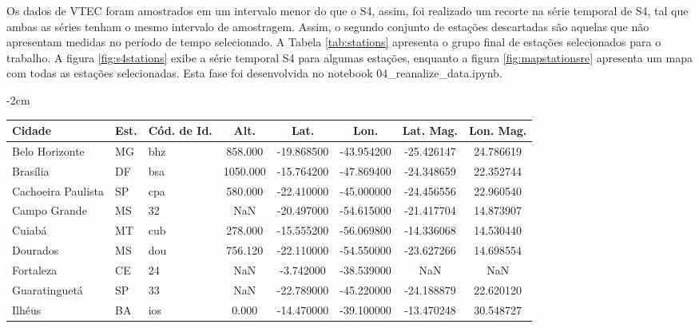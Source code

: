 Os dados de VTEC foram amostrados em um intervalo menor do que o S4, assim, foi realizado um recorte na série temporal de S4, tal que ambas as séries tenham o mesmo intervalo de amostragem. Assim, o segundo conjunto de estações descartadas são aquelas que não apresentam medidas no período de tempo selecionado. A Tabela \ref{tab:stations} apresenta o grupo final de estações selecionados para o trabalho. A figura \ref{fig:s4stations} exibe a série temporal S4 para algumas estações, enquanto a figura \ref{fig:mapstationsre} apresenta um mapa com todas as estações selecionadas. Esta fase foi desenvolvida no notebook 04\_reanalize\_data.ipynb.

\begin{table}
\addtolength{\leftskip} {-2cm} %
\addtolength{\rightskip}{-2cm}
\small
\begin{tabular}{|l|l|l|c|c|c|c|c|}
\hline
Cidade              & Est.  & Cód. de Id.           &  Alt.     &   Lat.     &  Lon.      &  Lat. Mag.    &  Lon. Mag.       \\ \hline
Belo Horizonte      &    MG &                   bhz &   858.000 & -19.868500 & -43.954200 &    -25.426147 &      24.786619   \\ \hline
Brasília            &    DF &                   bsa &  1050.000 & -15.764200 & -47.869400 &    -24.348659 &      22.352744   \\ \hline
Cachoeira Paulista  &    SP &                   cpa &   580.000 & -22.410000 & -45.000000 &    -24.456556 &      22.960540   \\ \hline
Campo Grande        &    MS &                    32 &       NaN & -20.497000 & -54.615000 &    -21.417704 &      14.873907   \\ \hline
Cuiabá              &    MT &                   cub &   278.000 & -15.555200 & -56.069800 &    -14.336068 &      14.530440   \\ \hline
Dourados            &    MS &                   dou &   756.120 & -22.110000 & -54.550000 &    -23.627266 &      14.698554   \\ \hline
Fortaleza           &    CE &                    24 &       NaN &  -3.742000 & -38.539000 &           NaN &            NaN   \\ \hline
Guaratinguetá       &    SP &                    33 &       NaN & -22.789000 & -45.220000 &    -24.188879 &      22.620120   \\ \hline
Ilhéus              &    BA &                   ios &     0.000 & -14.470000 & -39.100000 &    -13.470248 &      30.548727   \\ \hline

\end{tabular}
\end{table}

